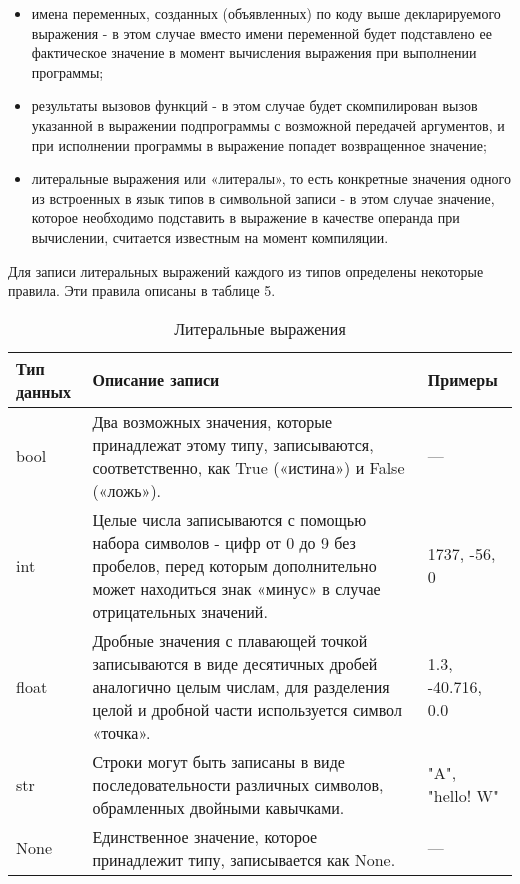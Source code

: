 \begin{itemize}
    \item имена переменных, созданных (объявленных) по коду выше декларируемого выражения - в этом случае вместо имени переменной будет подставлено ее фактическое значение в момент вычисления выражения при выполнении программы;
    \item результаты вызовов функций - в этом случае будет скомпилирован вызов указанной в выражении подпрограммы с возможной передачей аргументов, и при исполнении программы в выражение попадет возвращенное значение;
    \item литеральные выражения или «литералы», то есть конкретные значения одного из встроенных в язык типов в символьной записи - в этом случае значение, которое необходимо подставить в выражение в качестве операнда при вычислении, считается известным на момент компиляции.
\end{itemize}

Для записи литеральных выражений каждого из типов определены некоторые правила. Эти правила описаны в таблице 5.

\begin{table}[h]
    \centering
    \caption{Литеральные выражения}
    \label{tab:literals}
    \begin{tabular}{lp{6cm}p{4cm}}
        \toprule
        \textbf{Тип данных} & \textbf{Описание записи}                                                                                                                                                     & \textbf{Примеры}  \\
        \midrule
        bool                & Два возможных значения, которые принадлежат этому типу, записываются, соответственно, как True («истина») и False («ложь»).                                                  & ---               \\
        \addlinespace
        int                 & Целые числа записываются с помощью набора символов - цифр от 0 до 9 без пробелов, перед которым дополнительно может находиться знак «минус» в случае отрицательных значений. & 1737, -56, 0      \\
        \addlinespace
        float               & Дробные значения с плавающей точкой записываются в виде десятичных дробей аналогично целым числам, для разделения целой и дробной части используется символ «точка».         & 1.3, -40.716, 0.0 \\
        \addlinespace
        str                 & Строки могут быть записаны в виде последовательности различных символов, обрамленных двойными кавычками.                                                                     & "A", "hello! W"   \\
        \addlinespace
        None                & Единственное значение, которое принадлежит типу, записывается как None.                                                                                                      & ---               \\
        \bottomrule
    \end{tabular}
\end{table}

